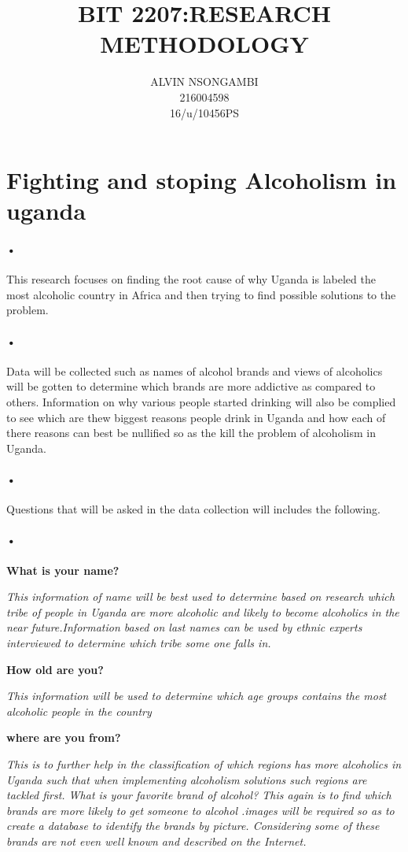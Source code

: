 \documentclass[11pt]{article}
\title{BIT 2207:RESEARCH METHODOLOGY}
\author{ALVIN NSONGAMBI\\216004598\\16/u/10456PS}
\begin{document}
	\maketitle
\section{Fighting and stoping Alcoholism in uganda }
\paragraph{•}
This research focuses on finding the root cause of why Uganda is labeled the most alcoholic country in Africa and then trying to find possible solutions to the problem.
\paragraph{•}
Data will be collected such as names of alcohol brands and views of alcoholics will be gotten to determine which brands are more addictive as compared to others.
Information on why various people started drinking will also be complied to see which are thew biggest reasons people drink in Uganda and how each of there reasons can best be nullified so as the kill the problem of alcoholism in Uganda.
\paragraph{•}
Questions that will be asked in the data collection will includes the following.
\paragraph{•}
\textbf{What is your name?}

\textit{This information of name will be best used to determine based on research which tribe of people in Uganda are more alcoholic and likely to become alcoholics in the near future.Information based on last names can be used by ethnic experts interviewed to determine which tribe some one falls in.}


\textbf{How old are you?}

\textit{This information will be used to determine which age groups contains the most alcoholic people in the country }


\textbf{where are you from?}

\textit{This is to further help in the classification of which regions has more alcoholics in Uganda such that when implementing alcoholism solutions such regions are tackled first.
What is your favorite brand of alcohol?
This again is to find which brands are more likely to get someone to alcohol .images will be required so as to create a database to identify the brands by picture.
Considering some of these brands are not even well known and described on the Internet.}
\end{document}
